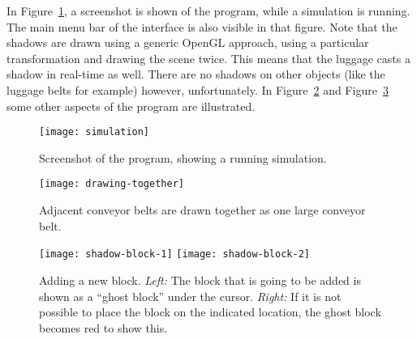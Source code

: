 In Figure~\ref{fig:simulation}, a screenshot is shown of the program, while a simulation is running. The main menu bar of the interface is also visible in that figure. Note that the shadows are drawn using a generic OpenGL approach, using a particular transformation and drawing the scene twice. This means that the luggage casts a shadow in real-time as well. There are no shadows on other objects (like the luggage belts for example) however, unfortunately. In Figure~\ref{fig:drawing-together} and Figure~\ref{fig:shadow-block} some other aspects of the program are illustrated.

\begin{figure}
  \begin{center}
    \texttt{[image: simulation]}
    \caption{Screenshot of the program, showing a running simulation.}
    \label{fig:simulation}
  \end{center}
\end{figure}

\begin{figure}
  \begin{center}
    \texttt{[image: drawing-together]}
    \caption{Adjacent conveyor belts are drawn together as one large conveyor belt.}
    \label{fig:drawing-together}
  \end{center}
\end{figure}

\begin{figure}
  \begin{center}
    \texttt{[image: shadow-block-1]}
    \quad
    \texttt{[image: shadow-block-2]}
    \caption{Adding a new block. \textit{Left:} The block that is going to be added is shown as a ``ghost block'' under the cursor. \textit{Right:} If it is not possible to place the block on the indicated location, the ghost block becomes red to show this.}
    \label{fig:shadow-block}
  \end{center}
\end{figure}

